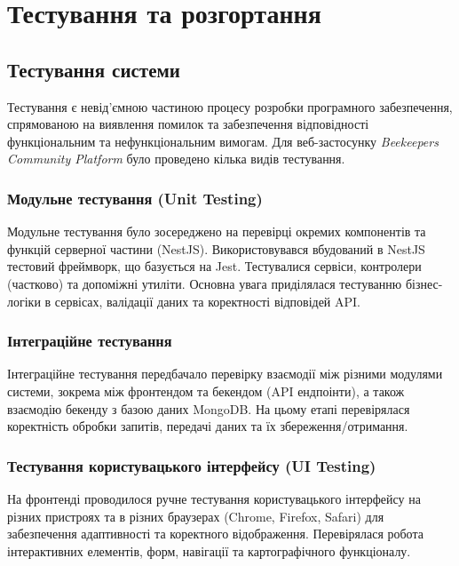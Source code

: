 \chapter{Тестування та розгортання}
\label{ch:testing_deployment}

\section{Тестування системи}
\label{sec:testing}
Тестування є невід'ємною частиною процесу розробки програмного забезпечення, спрямованою на виявлення помилок та забезпечення відповідності функціональним та нефункціональним вимогам. Для веб-застосунку \textit{Beekeepers Community Platform} було проведено кілька видів тестування.

\subsection{Модульне тестування (Unit Testing)}
Модульне тестування було зосереджено на перевірці окремих компонентів та функцій серверної частини (NestJS). Використовувався вбудований в NestJS тестовий фреймворк, що базується на Jest. Тестувалися сервіси, контролери (частково) та допоміжні утиліти. Основна увага приділялася тестуванню бізнес-логіки в сервісах, валідації даних та коректності відповідей API.

\subsection{Інтеграційне тестування}
Інтеграційне тестування передбачало перевірку взаємодії між різними модулями системи, зокрема між фронтендом та бекендом (API ендпоінти), а також взаємодію бекенду з базою даних MongoDB. На цьому етапі перевірялася коректність обробки запитів, передачі даних та їх збереження/отримання.

\subsection{Тестування користувацького інтерфейсу (UI Testing)}
На фронтенді проводилося ручне тестування користувацького інтерфейсу на різних пристроях та в різних браузерах (Chrome, Firefox, Safari) для забезпечення адаптивності та коректного відображення. Перевірялася робота інтерактивних елементів, форм, навігації та картографічного функціоналу.

